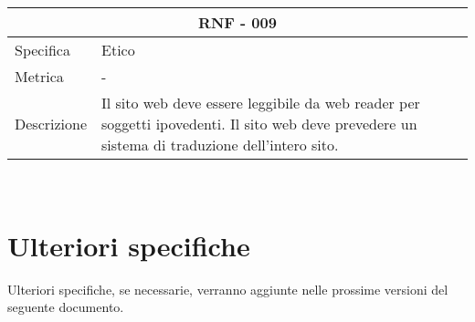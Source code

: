 \documentclass{article}
\begin{document}
\vspace{4mm} 
\begin{tabular}{ |p{3cm}|p{8cm}|  }
	\hline
	\multicolumn{2}{|c|}{\textbf{RNF - 009}} \\
	\hline
	Specifica&Etico \\
	\hline
	Metrica &  -\\
	\hline
	Descrizione&Il sito web deve essere leggibile da web reader per soggetti ipovedenti. Il sito web deve prevedere un sistema di traduzione dell'intero sito.\\
	\hline
\end{tabular}\\

\section{\textbf{Ulteriori specifiche}}
Ulteriori specifiche, se necessarie, verranno aggiunte nelle prossime versioni del seguente documento.
\end{document}
